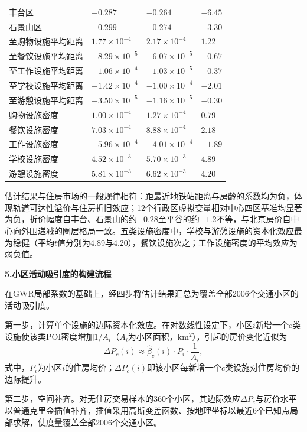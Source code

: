 {\begin{longtable}{L{5.6cm}C{2.5cm}C{2.5cm}C{2.2cm}}
丰台区 & $-0.287$ & $-0.264$ & $-6.45$ \\
石景山区 & $-0.299$ & $-0.274$ & $-3.30$ \\
至购物设施平均距离 & $1.77\times10^{-4}$ & $2.17\times10^{-4}$ & $1.22$ \\
至餐饮设施平均距离 & $-8.29\times10^{-5}$ & $-6.07\times10^{-5}$ & $-0.67$ \\
至工作设施平均距离 & $-1.06\times10^{-4}$ & $-1.03\times10^{-5}$ & $-0.37$ \\
至学校设施平均距离 & $-1.42\times10^{-4}$ & $-1.00\times10^{-4}$ & $-2.01$ \\
至游憩设施平均距离 & $-3.50\times10^{-5}$ & $-1.16\times10^{-5}$ & $-0.30$ \\
购物设施密度 & $1.00\times10^{-4}$ & $1.27\times10^{-4}$ & $0.79$ \\
餐饮设施密度 & $7.03\times10^{-4}$ & $8.88\times10^{-4}$ & $2.18$ \\
工作设施密度 & $-5.96\times10^{-4}$ & $-4.01\times10^{-4}$ & $-1.89$ \\
学校设施密度 & $4.52\times10^{-3}$ & $5.70\times10^{-3}$ & $4.89$ \\
游憩设施密度 & $5.81\times10^{-3}$ & $6.62\times10^{-3}$ & $4.20$ \\
\end{longtable}
}

估计结果与住房市场的一般规律相符：距最近地铁站距离与房龄的系数均为负，体现轨道可达性溢价与住房折旧效应；12个行政区虚拟变量相对中心四区基准均显著为负，折价幅度自丰台、石景山的约$-0.28$至平谷的约$-1.2$不等，与北京房价自中心向外围递减的圈层格局一致。五类设施密度中，学校与游憩设施的资本化效应最为稳健（平均$t$值分别为4.89与4.20），餐饮设施次之；工作设施密度的平均效应为弱负值。

\textbf{5.小区活动吸引度的构建流程}

在GWR局部系数的基础上，经四步将估计结果汇总为覆盖全部2006个交通小区的活动吸引度。

第一步，计算单个设施的边际资本化效应。在对数线性设定下，小区$i$新增一个$c$类设施使该类POI密度增加$1/A_i$（$A_i$为小区面积，km$^2$），引起的房价变化近似为
\begin{equation}
\Delta P_c(i)\approx\hat{\beta}_c(i)\cdot P_i\cdot\frac{1}{A_i},
\label{eq.hedonic.marginal}
\end{equation}
式中，$P_i$为小区$i$的住房均价；$\Delta P_c(i)$即该小区每新增一个$c$类设施对住房均价的边际提升。

第二步，空间补齐。对无住房交易样本的360个小区，其边际效应$\Delta P_c$与房价水平以普通克里金插值补齐\citep{cressieStatisticsSpatialData1992}，插值采用高斯变差函数、按地理坐标以最近6个已知点局部求解，使度量覆盖全部2006个交通小区。


